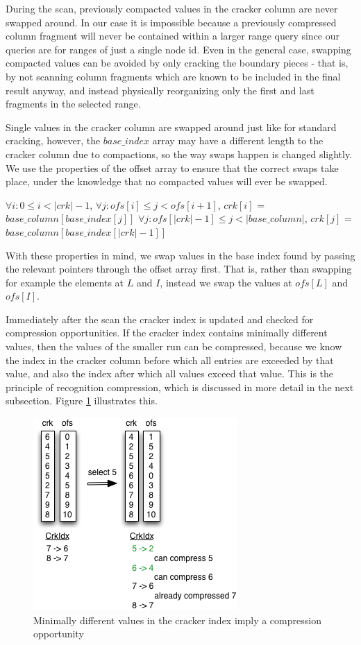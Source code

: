 During the scan, previously compacted values in the cracker column are never swapped around. In our case it is impossible because a previously compressed column fragment will never be contained within a larger range query since our queries are for ranges of just a single node id. Even in the general case, swapping compacted values can be avoided by only cracking the boundary pieces - that is, by not scanning column fragments which are known to be included in the final result anyway, and instead physically reorganizing only the first and last fragments in the selected range.

Single values in the cracker column are swapped around just like for standard cracking, however, the $base\_index$ array may have a different length to the cracker column due to compactions, so the way swaps happen is changed slightly. We use the properties of the offset array to ensure that the correct swaps take place, under the knowledge that no compacted values will ever be swapped.

\begin{tcolorbox}
$\forall i: 0 \leq i < |crk|-1$, $\forall j: ofs[i] \leq j < ofs[i+1]$, $crk[i]$ = $base\_column[base\_index[j]]$
$\forall j: ofs[|crk|-1] \leq j < |base\_column|$, $crk[j]$ = $base\_column[base\_index[|crk|-1]]$
\end{tcolorbox}

With these properties in mind, we swap values in the base index found by passing the relevant pointers through the offset array first. That is, rather than swapping for example the elements at $L$ and $I$, instead we swap the values at $ofs[L]$ and $ofs[I]$.

Immediately after the scan the cracker index is updated and checked for compression opportunities. If the cracker index contains minimally different values, then the values of the smaller run can be compressed, because we know the index in the cracker column before which all entries are exceeded by that value, and also the index after which all values exceed that value. This is the principle of recognition compression, which is discussed in more detail in the next subsection. Figure \ref{fig:compaction_recognition} illustrates this.

\begin{figure}[H]
  \centering
  \includegraphics[]{images/d6_compaction_recognition}
  \caption{Minimally different values in the cracker index imply a compression opportunity}
  \label{fig:compaction_recognition}
\end{figure}

